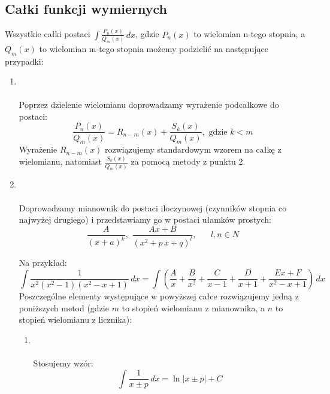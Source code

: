 \documentclass[10pt, twoside, fleqn]{article}
\begin{document}
	\newpage		
	\subsection{Całki funkcji wymiernych}
		
		Wszystkie całki postaci $ \displaystyle \int{\frac{P_n(x)}{Q_m(x)}\,dx} $, gdzie $ P_n(x) $ to wielomian n-tego stopnia, a $ Q_m(x) $ to wielomian m-tego stopnia możemy podzielić na następujące przypadki:
		
		\begin{enumerate}
		
			\item {} \\ \\
				Poprzez dzielenie wielomianu doprowadzamy wyrażenie podcałkowe do postaci: 
				\begin{equation*} 
					\frac{P_n(x)}{Q_m(x)}=
					R_{n-m}(x)+\frac{S_k(x)}{Q_m(x)}, \text{ gdzie } k < m
				\end{equation*} 
				Wyrażenie $ R_{n-m}(x) $ rozwiązujemy standardowym wzorem na całkę z wielomianu, natomiast $ \displaystyle \frac{S_k(x)}{Q_m(x)} $ za pomocą metody z punktu 2. \\
				
			\item {} \\ \\
				Doprowadzamy mianownik do postaci iloczynowej (czynników stopnia co najwyżej drugiego) i przedstawiamy go w postaci ułamków prostych:
				\begin{equation*} 
					\frac{A}{(x+a)^k}, \,\, 
					\frac{Ax+B}{(x^2+p \, x+q)^l},
					\hspace{20pt} l,n \in N 
				\end{equation*} 
				
				Na przykład:
				\begin{equation*}
					\int{\frac{1}{x^2(x^2-1)(x^2-x+1)}\,dx}
					=\int{\left(\frac{A}{x} + \frac{B}{x^2}
					+ \frac{C}{x-1} + \frac{D}{x+1} + 
					\frac{Ex+F}{x^2-x+1}\right)\,dx}
				\end{equation*}
				Poszczególne elementy występujące w powyższej całce rozwiązujemy 
				jedną z poniższych metod (gdzie $m$ to stopień wielomianu z
				mianownika, a $n$ to stopień wielomianu z licznika):	
		
		\begin{enumerate}
		
			\item {} \\ \\ 
				Stosujemy wzór:
			\begin{equation*}
				\int{\frac{1}{x \pm p}\,dx}=\ln\left| x \pm p \right|+C
			\end{equation*}
		

\end{enumerate}
\end{enumerate}
\end{document}
